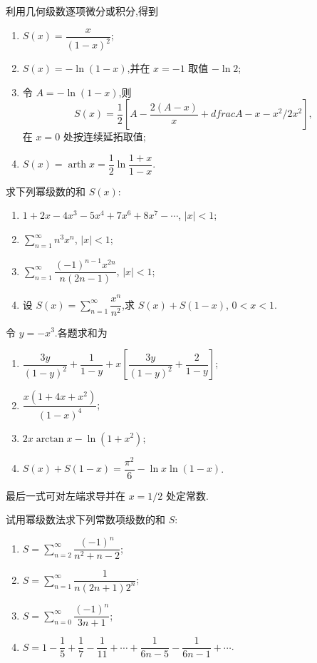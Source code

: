 \begin{solution}
    利用几何级数逐项微分或积分,得到
    \begin{enumerate}
        \item $\displaystyle S(x)=\dfrac{x}{(1-x)^2}$;
        \item $S(x)=-\ln(1-x)$,并在 $x=-1$ 取值 $-\ln2$;
        \item 令 $A=-\ln(1-x)$,则
              \[
                  S(x)=\dfrac{1}{2}\left[A-\dfrac{2(A-x)}x+dfrac{A-x-x^2/2}{x^2}\right],
              \]
              在 $x=0$ 处按连续延拓取值;
        \item $\displaystyle S(x)=\operatorname{arth}x
                  =\dfrac{1}{2}\ln\dfrac{1+x}{1-x}$.
    \end{enumerate}
\end{solution}

\begin{example}
    求下列幂级数的和 $S(x)$:
    \begin{enumerate}
        \item $1+2x-4x^3-5x^4+7x^6+8x^7-\cdots$, $|x|<1$;
        \item $\displaystyle\sum\limits_{n=1}^{\infty}n^3x^n$, $|x|<1$;
        \item $\displaystyle\sum\limits_{n=1}^{\infty}\dfrac{(-1)^{n-1}x^{2n}}{n(2n-1)}$, $|x|<1$;
        \item 设 $\displaystyle S(x)=\sum\limits_{n=1}^{\infty}\dfrac{x^n}{n^2}$,求 $S(x)+S(1-x)$, $0<x<1$.
    \end{enumerate}
\end{example}
\exampleblank

\begin{solution}
    令 $y=-x^3$.各题求和为
    \begin{enumerate}
        \item $\displaystyle \dfrac{3y}{(1-y)^2}+\dfrac{1}{1-y}
                  +x\left[\dfrac{3y}{(1-y)^2}+\dfrac{2}{1-y}\right]$;
        \item $\displaystyle\dfrac{x(1+4x+x^2)}{(1-x)^4}$;
        \item $2x\arctan x-\ln(1+x^2)$;
        \item $\displaystyle S(x)+S(1-x)=\dfrac{\pi^2}{6}-\ln x\ln(1-x)$.
    \end{enumerate}
    最后一式可对左端求导并在 $x=1/2$ 处定常数.
\end{solution}

\begin{example}
    试用幂级数法求下列常数项级数的和 $S$:
    \begin{enumerate}
        \item $\displaystyle S=\sum\limits_{n=2}^{\infty}\dfrac{(-1)^n}{n^2+n-2}$;
        \item $\displaystyle S=\sum\limits_{n=1}^{\infty}\dfrac{1}{n(2n+1)2^n}$;
        \item $\displaystyle S=\sum\limits_{n=0}^{\infty}\dfrac{(-1)^n}{3n+1}$;
        \item $\displaystyle S=1-\dfrac{1}{5}+\dfrac{1}{7}-\dfrac{1}{11}+\cdots+\dfrac{1}{6n-5}-\dfrac{1}{6n-1}+\cdots$.
    \end{enumerate}
\end{example}
\exampleblank

